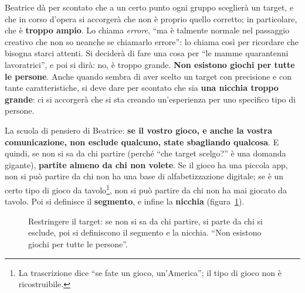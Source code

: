 

Beatrice dà per scontato che a un certo punto ogni gruppo sceglierà un target, e che
in corso d'opera si accorgerà che non è proprio quello corretto; in particolare, che
è \textbf{troppo ampio}. Lo chiama \emph{errore}, ``ma è talmente normale nel
passaggio creativo che non so neanche se chiamarlo errore'': lo chiama così per
ricordare che bisogna starci attenti. Si deciderà di fare una cosa per ``le mamme
quarantenni lavoratrici'', e poi si dirà: no, è troppo grande. \textbf{Non esistono
giochi per tutte le persone}. Anche quando sembra di aver scelto un target con
precisione e con tante caratteristiche, si deve dare per scontato che sia \textbf{una
nicchia troppo grande}: ci si accorgerà che si sta creando un'esperienza per uno
specifico tipo di persone.

La scuola di pensiero di Beatrice: \textbf{se il vostro gioco, e anche la vostra
comunicazione, non esclude qualcuno, state sbagliando qualcosa}. E quindi, se non si
sa da chi partire (perché ``che target scelgo?'' è una domanda gigante),
\textbf{partite almeno da chi non volete}. Se il gioco ha una piccola app, non si può
partire da chi non ha una base di alfabetizzazione digitale; se è un certo tipo di gioco
da tavolo\footnote{La trascrizione dice ``se fate un gioco, un'America''; il tipo di
gioco non è ricostruibile.}, non si può partire da chi non ha mai giocato da tavolo.
Poi si definisce il \textbf{segmento}, e infine la \textbf{nicchia}
(figura~\ref{a6:fig:nicchia}).

\begin{figure}[htbp]
\centering
{}
\caption{Restringere il target: se non si sa da chi partire, si parte da chi si esclude,
poi si definiscono il segmento e la nicchia. ``Non esistono giochi per tutte le
persone''.}
\label{a6:fig:nicchia}
\end{figure}

